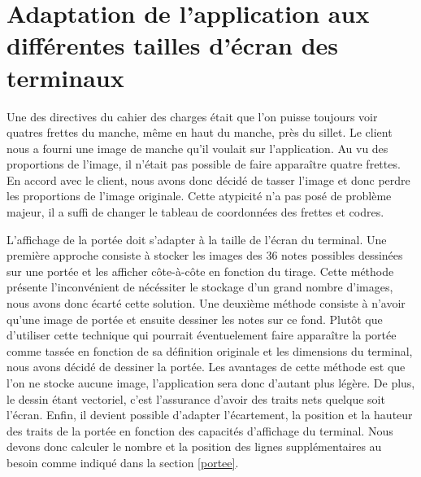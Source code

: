 \documentclass{scrreprt}
\begin{document}

\section{Adaptation de l'application aux différentes tailles d'écran des terminaux}
Une des directives du cahier des charges était que l'on puisse toujours voir quatres frettes du manche, même en haut du manche, près du sillet.
Le client nous a fourni une image de manche qu'il voulait sur l'application.
Au vu des proportions de l'image, il n'était pas possible de faire apparaître quatre frettes.
En accord avec le client, nous avons donc décidé de tasser l'image et donc perdre les proportions de l'image originale.
Cette atypicité n'a pas posé de problème majeur, il a suffi de changer le tableau de coordonnées des frettes et codres.
\newline 

L'affichage de la portée doit s'adapter à la taille de l'écran du terminal.
Une première approche consiste à stocker les images des 36 notes possibles dessinées sur une portée et les afficher côte-à-côte en fonction du tirage.
Cette méthode présente l'inconvénient de nécéssiter le stockage d'un grand nombre d'images, nous avons donc écarté cette solution.
Une deuxième méthode consiste à n'avoir qu'une image de portée et ensuite dessiner les notes sur ce fond. 
Plutôt que d'utiliser cette technique qui pourrait éventuelement faire apparaître la portée comme tassée en fonction de sa définition originale et les dimensions du terminal, nous avons décidé de dessiner la portée.
Les avantages de cette méthode est que l'on ne stocke aucune image, l'application sera donc d'autant plus légère.
De plus, le dessin étant vectoriel, c'est l'assurance d'avoir des traits nets quelque soit l'écran.
Enfin, il devient possible d'adapter l'écartement, la position et la hauteur des traits de la portée en fonction des capacités d'affichage du terminal.
Nous devons donc calculer le nombre et la position des lignes supplémentaires au besoin comme indiqué dans la section \ref{portee}.
\newline
\end{document}
